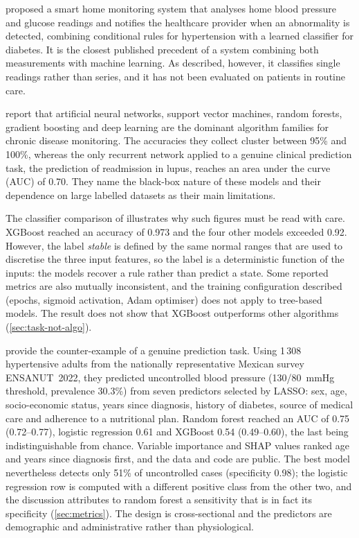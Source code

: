 \Textcite{chatrati2022} proposed a smart home monitoring system that analyses home blood pressure and glucose readings and notifies the healthcare provider when an abnormality is detected, combining conditional rules for hypertension with a learned classifier for diabetes. It is the closest published precedent of a system combining both measurements with machine learning. As described, however, it classifies single readings rather than series, and it has not been evaluated on patients in routine care.

\Textcite{liu2025review} report that artificial neural networks, support vector machines, random forests, gradient boosting and deep learning are the dominant algorithm families for chronic disease monitoring. The accuracies they collect cluster between 95\% and 100\%, whereas the only recurrent network applied to a genuine clinical prediction task, the prediction of readmission in lupus, reaches an area under the curve (AUC) of 0.70. They name the black-box nature of these models and their dependence on large labelled datasets as their main limitations.

The classifier comparison of \textcite{efendi2025} illustrates why such figures must be read with care. XGBoost reached an accuracy of 0.973 and the four other models exceeded 0.92. However, the label \emph{stable} is defined by the same normal ranges that are used to discretise the three input features, so the label is a deterministic function of the inputs: the models recover a rule rather than predict a state. Some reported metrics are also mutually inconsistent, and the training configuration described (epochs, sigmoid activation, Adam optimiser) does not apply to tree-based models. The result does not show that XGBoost outperforms other algorithms (\cref{sec:task-not-algo}).

\Textcite{mendoza2025} provide the counter-example of a genuine prediction task. Using 1\,308 hypertensive adults from the nationally representative Mexican survey ENSANUT~2022, they predicted uncontrolled blood pressure (130/80~mmHg threshold, prevalence 30.3\%) from seven predictors selected by LASSO: sex, age, socio-economic status, years since diagnosis, history of diabetes, source of medical care and adherence to a nutritional plan. Random forest reached an AUC of 0.75 (0.72--0.77), logistic regression 0.61 and XGBoost 0.54 (0.49--0.60), the last being indistinguishable from chance. Variable importance and SHAP values ranked age and years since diagnosis first, and the data and code are public. The best model nevertheless detects only 51\% of uncontrolled cases (specificity 0.98); the logistic regression row is computed with a different positive class from the other two, and the discussion attributes to random forest a sensitivity that is in fact its specificity (\cref{sec:metrics}). The design is cross-sectional and the predictors are demographic and administrative rather than physiological.

